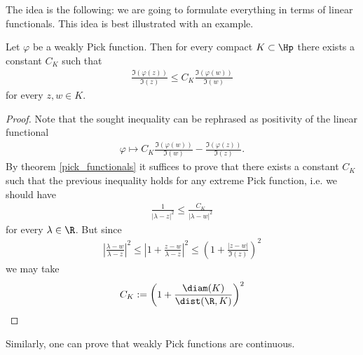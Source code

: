 The idea is the following: we are going to formulate everything in terms of linear functionals. This idea is best illustrated with an example.

\begin{lem}\label{pick_harnack_lemma}
	Let $\varphi$ be a weakly Pick function. Then for every compact $K \subset \Hp$ there exists a constant $C_{K}$ such that
	\begin{align*}
		\frac{\Im(\varphi(z))}{\Im(z)} \leq C_{K} \frac{\Im(\varphi(w))}{\Im(w)}
	\end{align*}
	for every $z, w \in K$.
\end{lem}
\begin{proof}
	Note that the sought inequality can be rephrased as positivity of the linear functional
	\begin{align*}
		\varphi \mapsto C_{K} \frac{\Im(\varphi(w))}{\Im(w)} - \frac{\Im(\varphi(z))}{\Im(z)}.
	\end{align*}
	By theorem \ref{pick_functionals} it suffices to prove that there exists a constant $C_{K}$ such that the previous inequality holds for any extreme Pick function, i.e. we should have
	\begin{align*}
		\frac{1}{|\lambda - z|^2} \leq \frac{C_{K}}{|\lambda - w|^2}
	\end{align*}
	for every $\lambda \in \R$. But since
	\begin{align*}
		\left|\frac{\lambda - w}{\lambda - z}\right|^2 \leq \left|1 + \frac{z - w}{\lambda - z}\right|^2 \leq \left(1 + \frac{|z - w|}{\Im(z)}\right)^2
	\end{align*}
	we may take
	\begin{align*}
		C_{K} := \left(1 + \frac{\diam(K)}{\dist(\R, K)}\right)^2
	\end{align*}
\end{proof}

Similarly, one can prove that weakly Pick functions are continuous.

